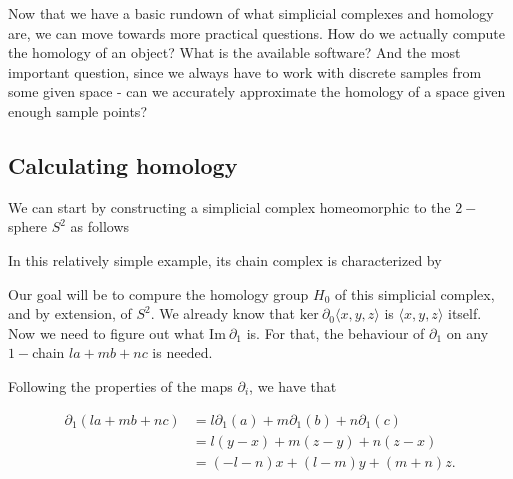 Now that we have a basic rundown of what simplicial complexes and homology are, we can move towards more practical questions. How do we actually compute the homology of an object? What is the available software? And the most important question, since we always have to work with discrete samples from some given space - can we accurately approximate the homology of a space given enough sample points?

\subsection{Calculating homology}

We can start by constructing a simplicial complex homeomorphic to the $2-$sphere $S^{2}$ as follows

\begin{figure}[h]
  \centering
\end{figure}

In this relatively simple example, its chain complex is characterized by

\begin{figure}[h]
  \centering
\end{figure}

Our goal will be to compure the homology group $H_{0}$ of this simplicial complex, and by extension, of $S^{2}$. We already know that $\text{ker}\:\partial_{0}\langle x,y,z \rangle$ is $\langle x,y,z \rangle$ itself. Now we need to figure out what $\text{Im}\:\partial_{1}$ is. For that, the behaviour of $\partial_{1}$ on any $1-$chain $la + mb + nc$ is needed.

Following the properties of the maps $\partial_{i}$, we have that

\begin{align*}
  \partial_{1}(la + mb + nc) &= l\partial_{1}(a) + m\partial_{1}(b) + n\partial_{1}(c) \\
  &= l(y-x) + m(z-y) + n(z-x) \\
  &= (-l-n)x + (l-m)y + (m+n)z.
\end{align*}

